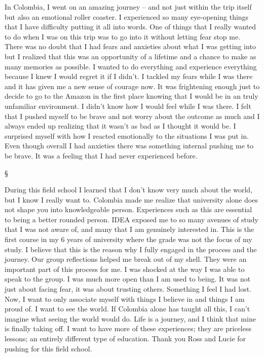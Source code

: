 \documentclass[letterpaper,10pt,headsepline]{scrreprt}
\begin{document}
In Colombia, I went on an amazing journey -- and not just within the
trip itself but also an emotional roller coaster. I experienced so many
eye-opening things that I have difficulty putting it all into words. One
of things that I really wanted to do when I was on this trip was to go
into it without letting fear stop me. There was no doubt that I had
fears and anxieties about what I was getting into but I realized that
this was an opportunity of a lifetime and a chance to make as many
memories as possible. I wanted to do everything and experience
everything because I knew I would regret it if I didn't. I tackled my
fears while I was there and it has given me a new sense of courage now.
It was frightening enough just to decide to go to the Amazon in the
first place knowing that I would be in an truly unfamiliar environment.
I didn't know how I would feel while I was there. I felt that I pushed
myself to be brave and not worry about the outcome as much and I always
ended up realizing that it wasn't as bad as I thought it would be. I
surprised myself with how I reacted emotionally to the situations I was
put in. Even though overall I had anxieties there was something internal
pushing me to be brave. It was a feeling that I had never experienced
before.

\begin{center}§\end{center}

During this field school I learned that I don't know very much about the
world, but I know I really want to. Colombia made me realize that
university alone does not shape you into knowledgeable person.
Experiences such as this are essential to being a better rounded person.
IDEA exposed me to so many avenues of study that I was not aware of, and
many that I am genuinely interested in. This is the first course in my 6
years of university where the grade was not the focus of my study. I
believe that this is the reason why I fully engaged in the process and
the journey. Our group reflections helped me break out of my shell. They
were an important part of this process for me. I was shocked at the way
I was able to speak to the group. I was much more open than I am used to
being. It was not just about facing fear, it was about trusting others.
Something I feel I had lost. Now, I want to only associate myself with
things I believe in and things I am proud of. I want to see the world.
If Colombia alone has taught all this, I can't imagine what seeing the
world would do. Life is a journey, and I think that mine is finally
taking off. I want to have more of these experiences; they are priceless
lessons; an entirely different type of education. Thank you Ross and
Lucie for pushing for this field school.
\end{document}
